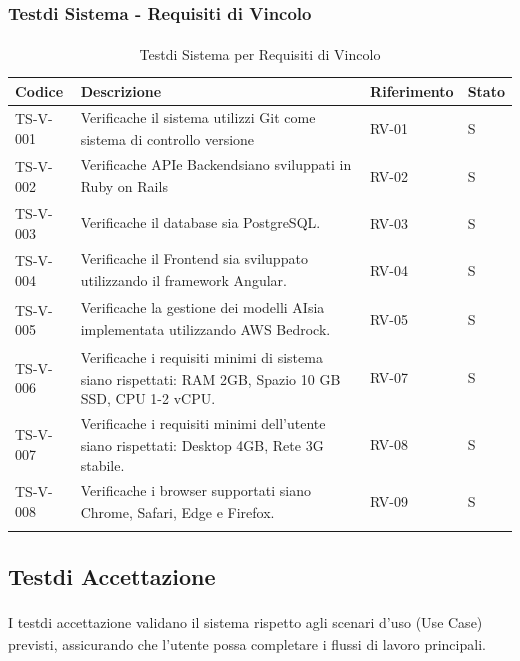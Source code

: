 \documentclass[a4paper,11pt]{article}
\renewcommand{\G}{\texorpdfstring{\textsubscript{\scalebox{0.6}{\textbf{G}}}\xspace}{ G}}
\begin{document}
\subsubsection{Test\G di Sistema - Requisiti di Vincolo\G}
\begin{longtable}{|p{2.5cm}|p{8cm}|p{2.5cm}|p{1.5cm}|}
\hline
\rowcolor{primaryblue!30} 
\textbf{Codice} & \textbf{Descrizione} & \textbf{Riferimento} & \textbf{Stato} \\
\hline
\endhead

TS-V-001 & Verifica\G che il sistema utilizzi Git come sistema di controllo versione & RV-01 & S \\ \hline
TS-V-002 & Verifica\G che API\G e Backend\G siano sviluppati in Ruby on Rails\G & RV-02 & S \\ \hline
TS-V-003 & Verifica\G che il database sia PostgreSQL\G. & RV-03 & S \\ \hline
TS-V-004 & Verifica\G che il Frontend sia sviluppato utilizzando il framework Angular\G. & RV-04 & S \\ \hline
TS-V-005 & Verifica\G che la gestione dei modelli AI\G sia
implementata utilizzando AWS Bedrock\G. & RV-05 & S \\ 
\hline
TS-V-006 & Verifica\G che i requisiti minimi di sistema siano rispettati: RAM 2GB,
Spazio 10 GB SSD, CPU 1-2 vCPU. & RV-07 & S \\ \hline
TS-V-007 & Verifica\G che i requisiti minimi dell'utente siano rispettati: Desktop 4GB, Rete 3G stabile. & RV-08 & S \\ \hline
TS-V-008 & Verifica\G che i browser supportati siano Chrome, Safari, Edge e Firefox. & RV-09 & S \\ \hline

\caption{Test\G di Sistema per Requisiti di Vincolo}
\label{tab:test-sistema-vincolo}
\end{longtable}

\subsection{Test\G di Accettazione}
I test\G di accettazione validano il sistema rispetto agli scenari d'uso (Use Case) previsti, assicurando che l'utente possa completare i flussi di lavoro principali.
\end{document}
